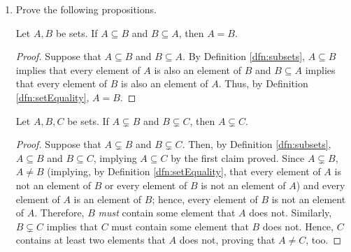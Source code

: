 \documentclass[../main.tex]{subfiles}
\begin{document}
\begin{enumerate}[ref={\thesection.\arabic*}]
\begin{lem}
\begin{proof}
            First, we show that $A\cup\emptyset=\emptyset\cup A$. This is a direct consequence of Lemma \ref{lem:commutativityUnion}.\par
            Next, we show that $A=A\cup\emptyset$. By Definition \ref{dfn:setEquality}, it will suffice to show that every element $x$ of $A$ is an element of $A\cup\emptyset$ and vice versa. By Axiom \ref{axm:pairwiseUnion}, every element $x$ of $A$ is an element of $A\cup\emptyset$. Now let $x\in A\cup\emptyset$. Then by Axiom \ref{axm:pairwiseUnion}, $x\in A$ or $x\in\emptyset$. By Axiom \ref{axm:emptyset}, $x\notin\emptyset$, so $x\in A$. Thus, every element of $A\cup\emptyset$ is an element of $A$. We now have by the transitive property that $A=A\cup\emptyset=\emptyset\cup A$.\par
            Lastly, we show that $A=A\cup A$. By Definition \ref{dfn:setEquality}, it will suffice to show that every element $x$ of $A$ is an element of $A\cup A$ and vice versa. By Axiom \ref{axm:pairwiseUnion}, every element $x$ of $A$ is an element of $A\cup A$. Now let $x\in A\cup A$. Then by Axiom \ref{axm:pairwiseUnion}, $x\in A$ or $x\in A$, implying $x\in A$. We have, at last, by the transitive property that $A=A\cup\emptyset=\emptyset\cup A=A\cup A$.
        \end{proof}
    \end{lem}
    \item \label{exr:3.1.4}Prove the following propositions.
    \begin{prp}
        Let $A,B$ be sets. If $A\subseteq B$ and $B\subseteq A$, then $A=B$.
        \begin{proof}
            Suppose that $A\subseteq B$ and $B\subseteq A$. By Definition \ref{dfn:subsets}, $A\subseteq B$ implies that every element of $A$ is also an element of $B$ and $B\subseteq A$ implies that every element of $B$ is also an element of $A$. Thus, by Definition \ref{dfn:setEquality}, $A=B$.
        \end{proof}
    \end{prp}
    \begin{prp}
        Let $A,B,C$ be sets. If $A\subsetneq B$ and $B\subsetneq C$, then $A\subsetneq C$.
        \begin{proof}
            Suppose that $A\subsetneq B$ and $B\subsetneq C$. Then, by Definition \ref{dfn:subsets}, $A\subseteq B$ and $B\subseteq C$, implying $A\subseteq C$ by the first claim proved. Since $A\subsetneq B$, $A\neq B$ (implying, by Definition \ref{dfn:setEquality}, that every element of $A$ is not an element of $B$ or every element of $B$ is not an element of $A$) and every element of $A$ is an element of $B$; hence, every element of $B$ is not an element of $A$. Therefore, $B$ \emph{must} contain some element that $A$ does not. Similarly, $B\subsetneq C$ implies that $C$ must contain some element that $B$ does not. Hence, $C$ contains at least two elements that $A$ does not, proving that $A\neq C$, too.

\end{proof}
\end{prp}
\end{enumerate}
\end{document}

